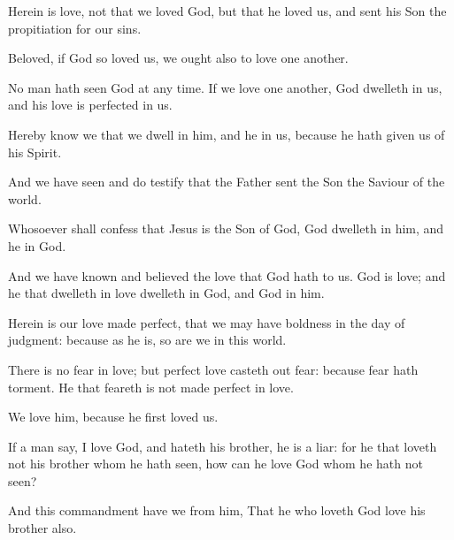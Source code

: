 {Herein
is
love,
not
that
we
loved
God,
but
that
he
loved
us,
and
sent
his
Son
{} the
propitiation
for
our
sins.

Beloved,
if
God
so
loved
us,
we
ought
also to
love one
another.

No
man hath
seen
God at any
time.
If we
love one
another,
God
dwelleth
in
us,
and
his
love
is
perfected
in
us.

Hereby know
we
that we
dwell
in
him,
and
he
in
us,
because he hath
given
us
of
his
Spirit.

And
we have
seen
and do
testify
that the
Father
sent the
Son
{} the
Saviour of the
world.

Whosoever shall
confess
that
Jesus
is the
Son of
God,
God
dwelleth
in
him,
and
he
in
God.

And
we have
known
and
believed the
love
that
God
hath
to
us.
God
is
love;
and he that
dwelleth
in
love
dwelleth
in
God,
and
God
in
him.

Herein
is
our
love made
perfect,
that we may
have
boldness
in the
day of
judgment:
because
as
he
is,
so
are
we
in
this
world.

There
is
no
fear
in
love;
but
perfect
love
casteth
out
fear:
because
fear
hath
torment. He that
feareth
is
not made
perfect
in
love.

We
love
him,
because
he
first
loved
us.

If a
man
say, I
love
God,
and
hateth
his
brother, he
is a
liar:
for he that
loveth
not
his
brother
whom he hath
seen,
how
can he
love
God
whom he
hath
not
seen?

And
this
commandment have
we
from
him,
That he who
loveth
God
love
his
brother
also.




\par }
